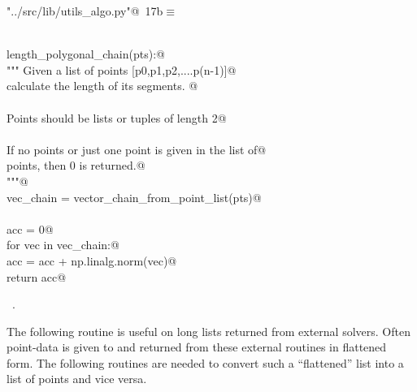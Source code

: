 \documentclass[11.5pt]{report}
\begin{document}
\begin{flushleft} \small\label{scrap7}\raggedright\small
{} \verb@"../src/lib/utils_algo.py"@\nobreak\ {\footnotesize {17b}}$\equiv$
\vspace{-1ex}
\begin{list}{}{} \item
\mbox{}\verb@@\\
\mbox{}\verb@def length_polygonal_chain(pts):@\\
\mbox{}\verb@    """ Given a list of points [p0,p1,p2,....p(n-1)]@\\
\mbox{}\verb@    calculate the length of its segments. @\\
\mbox{}\verb@@\\
\mbox{}\verb@    Points should be lists or tuples of length 2@\\
\mbox{}\verb@@\\
\mbox{}\verb@    If no points or just one point is given in the list of@\\
\mbox{}\verb@    points, then 0 is returned.@\\
\mbox{}\verb@    """@\\
\mbox{}\verb@    vec_chain = vector_chain_from_point_list(pts)@\\
\mbox{}\verb@@\\
\mbox{}\verb@    acc = 0@\\
\mbox{}\verb@    for vec in vec_chain:@\\
\mbox{}\verb@        acc = acc + np.linalg.norm(vec)@\\
\mbox{}\verb@    return acc@\\
\mbox{}\verb@@{\NWsep}
\end{list}
\vspace{-1.5ex}
\footnotesize
\begin{list}{}{\setlength{\itemsep}{-\parsep}\setlength{\itemindent}{-\leftmargin}}
\item \NWtxtFileDefBy\ .

\item{}
\end{list}
\vspace{4ex}
\end{flushleft}
\newchunk The following routine is useful on long lists returned from external solvers. 
Often point-data is given to and returned from these external routines in flattened
form. The following routines are needed to convert such a ``flattened'' list into 
a list of points and vice versa. 
\end{document}
